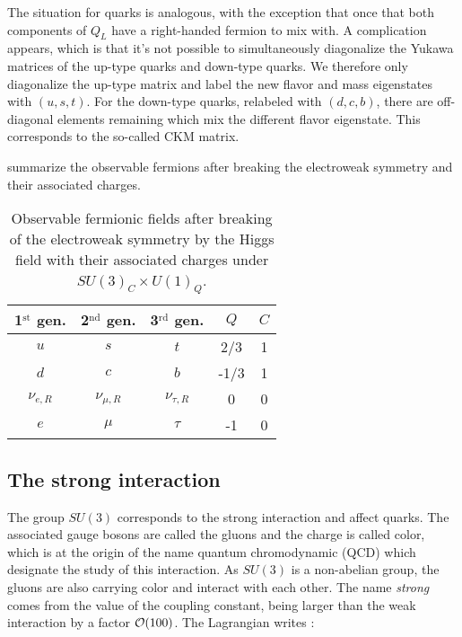     The situation for quarks is analogous, with the exception that once that both components
    of $Q_L$ have a right-handed fermion to mix with. A complication appears, which is that
    it's not possible to simultaneously diagonalize the Yukawa matrices of the up-type
    quarks and down-type quarks. We therefore only diagonalize the up-type matrix and
    label the new flavor and mass eigenstates with $(u,s,t)$. For the down-type quarks,
    relabeled with $(d,c,b)$, there are off-diagonal elements remaining which mix the
    different flavor eigenstate. This corresponds to the so-called CKM matrix.

     summarize the observable
    fermions after breaking the electroweak symmetry and their associated charges.

    \begin{table}
        \centering
        \begin{tabular}{|ccc||cc|}
            \hline
            1$^\text{st}$ gen. & 2$^\text{nd}$ gen. & 3$^\text{rd}$ gen.  & $Q$  & $C$\\
            \hline
            \hline
            $u$                & $s$                & $t$                 &  2/3 & 1  \\
            $d$                & $c$                & $b$                 & -1/3 & 1  \\
            \hline
            \hline
            $\nu_{e,R}$        & $\nu_{\mu,R}$      & $\nu_{\tau,R}$      &  0   & 0  \\
            $e$                & $\mu$              & $\tau$              & -1   & 0  \\
            \hline
        \end{tabular}
        \caption{Observable fermionic fields after breaking of the electroweak symmetry
        by the Higgs field with their associated charges under $SU(3)_C \times U(1)_Q$.}
        \label{tab:StandardModelFieldsAfterElectroweakBreaking}
    \end{table}

    \subsection{The strong interaction \label{sec:strongInteraction}}

    The group $SU(3)$ corresponds to the strong interaction and affect quarks. The
    associated gauge bosons are called the gluons and the charge is called color, which
    is at the origin of the name quantum chromodynamic (QCD) which designate the
    study of this interaction. As $SU(3)$ is a non-abelian group, the gluons are also
    carrying color and interact with each other.
    The name \emph{strong} comes from the value of the coupling constant, being larger
    than the weak interaction by a factor $\mathcal{O}(100)$. The Lagrangian writes :

